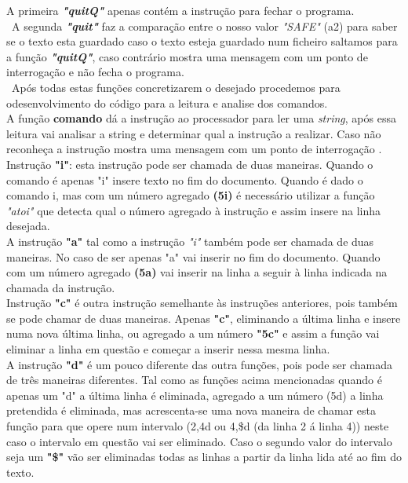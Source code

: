 \documentclass[letterpaper,12pt]{article}
\begin{document}
A primeira \emph{\textbf{"quitQ"}} apenas contém a instrução para fechar o programa.\vspace{0.5cm}\\\
A segunda \emph{\textbf{"quit"}} faz a comparação entre o nosso valor \emph{"SAFE"} (a2) para saber se o texto esta guardado  caso o texto esteja guardado num ficheiro saltamos para a função \emph{\textbf{"quitQ"}}, caso contrário mostra uma mensagem com um ponto de interrogação e não fecha o programa.\vspace{0.5cm}\\\
Após todas estas funções concretizarem o desejado procedemos para o\newline desenvolvimento do código para a leitura e analise dos comandos.\vspace{0.5cm}\\
A função \textbf{comando} dá a instrução ao processador para ler uma \emph{string}, após essa leitura vai analisar a string e determinar qual a instrução a realizar. Caso não reconheça a instrução mostra uma mensagem com um ponto de interrogação .\vspace{0.5cm}\\
Instrução\textbf{ "i"}: esta instrução pode ser chamada de duas maneiras. Quando o comando é apenas "i" insere texto no fim do documento. Quando é dado o comando i, mas com um número agregado \textbf{(5i)} é necessário utilizar a função \emph{"atoi"} que detecta qual o número agregado à instrução e assim insere na linha desejada.\vspace{0.5cm} \\
A instrução \textbf{"a"} tal como a instrução \emph{"i"} também pode ser chamada de duas maneiras. No caso de ser apenas "a" vai inserir no fim do documento. Quando com um número agregado \textbf{(5a)} vai inserir na linha a seguir à linha indicada na chamada da instrução.\vspace{0.5cm}\\
Instrução \textbf{"c"} é outra instrução semelhante às instruções anteriores, pois também se pode chamar de duas maneiras. Apenas \textbf{"c"}, eliminando a última linha e insere numa nova última linha, ou agregado a um número \textbf{"5c"} e assim a função vai eliminar a linha em questão e começar a inserir nessa mesma linha.\vspace{0.5cm}\\
A instrução \textbf{"d"} é um pouco diferente das outra funções, pois pode ser chamada de três maneiras diferentes. Tal como as funções acima mencionadas quando é apenas um "d" a última linha é eliminada, agregado a um número (5d) a linha pretendida é eliminada, mas acrescenta-se uma nova maneira de chamar esta função para que opere num intervalo (2,4d ou 4,\$d (da linha 2 á linha 4)) neste caso o intervalo em questão vai ser eliminado. Caso o segundo valor do intervalo seja um \textbf{"\$"} vão ser eliminadas todas as linhas a partir da linha lida até ao fim do texto.\vspace{0.5cm}\\
\end{document}
